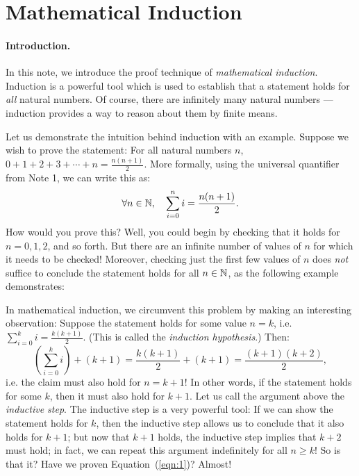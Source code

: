 \documentclass[11pt]{article}
\begin{document}
\maketitle

\section{Mathematical Induction}\label{scn:induction}

\paragraph{Introduction.} 
In this note, we introduce the proof technique of \emph{mathematical induction}. Induction is a powerful tool which is used to establish that a statement holds for \emph{all} natural numbers. Of course, there are infinitely many natural numbers --- induction provides a way to reason about them by finite means.

Let us demonstrate the intuition behind induction with an example. Suppose we wish to prove the statement: For all natural numbers $n$, $0 + 1 + 2 + 3 + \cdots + n = \frac{n(n+1)}{2}$. More formally, using the universal quantifier from Note 1, we can write this as:
\begin{equation}\label{eqn:1}
\forall n \in \mathbb{N}, \quad\sum^n_{i=0} i=\frac{n(n+1)}{2}.
\end{equation}
How would you prove this? Well, you could begin by checking that it holds for $n=0,1,2$, and so forth. But there are an {infinite} number of values of $n$ for which it needs to be checked! Moreover, checking just the first few values of $n$ does \emph{not} suffice to conclude the statement holds for all $n\in\mathbb{N}$, as the following example demonstrates:


In mathematical induction, we circumvent this problem by making an interesting observation: Suppose the statement holds for some value $n=k$, i.e. $\sum^k_{i=0} i=\frac{k(k+1)}{2}$. (This is called the \emph{induction hypothesis}.) Then:
\begin{equation}\label{eqn:2_1}
\left(\sum_{i=0}^{k} i\right) + (k+1)
= \frac{k(k+1)}{2} + (k+1)
= \frac{(k+1)(k+2)}{2},
\end{equation}
i.e. the claim must also hold for $n=k+1$! In other words, if the statement holds for some $k$, then it must also hold for $k+1$. Let us call the argument above the \emph{inductive step}. The inductive step is a very powerful tool: If we can show the statement holds for $k$, then the inductive step allows us to conclude that it also holds for $k+1$; but now that $k+1$ holds, the inductive step implies that $k+2$ must hold; in fact, we can repeat this argument indefinitely for all $n\geq k$! So is that it? Have we proven Equation~(\ref{eqn:1})? Almost!
\end{document}
